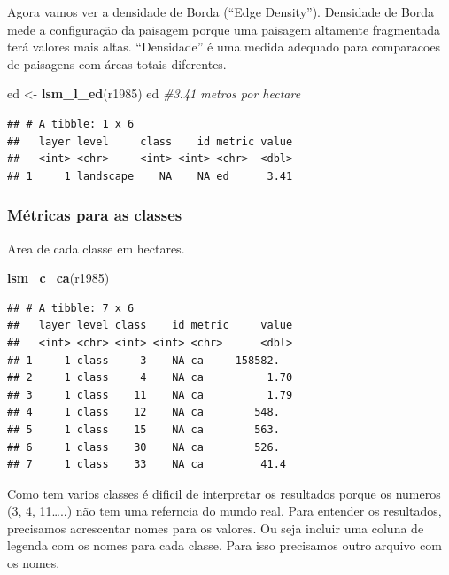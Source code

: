 \documentclass[
]{article}
\newenvironment{Shaded}{\begin{snugshade}}{\end{snugshade}}
\newcommand{\CommentTok}[1]{\textcolor[rgb]{0.56,0.35,0.01}{\textit{#1}}}
\newcommand{\FunctionTok}[1]{\textcolor[rgb]{0.13,0.29,0.53}{\textbf{#1}}}
\newcommand{\NormalTok}[1]{#1}
\newcommand{\OtherTok}[1]{\textcolor[rgb]{0.56,0.35,0.01}{#1}}
\begin{document}
Agora vamos ver a densidade de Borda (``Edge Density'').
Densidade de Borda mede a configuração da paisagem porque uma paisagem
altamente fragmentada terá valores mais altas. ``Densidade'' é uma medida
adequado para comparacoes de paisagens com áreas totais diferentes.

\begin{Shaded}
\begin{Highlighting}[]
\NormalTok{ed }\OtherTok{\textless{}{-}} \FunctionTok{lsm\_l\_ed}\NormalTok{(r1985) }
\NormalTok{ed }\CommentTok{\#3.41 metros por hectare}
\end{Highlighting}
\end{Shaded}

\begin{verbatim}
## # A tibble: 1 x 6
##   layer level     class    id metric value
##   <int> <chr>     <int> <int> <chr>  <dbl>
## 1     1 landscape    NA    NA ed      3.41
\end{verbatim}

\hypertarget{muxe9tricas-para-as-classes}{%
\subsubsection{Métricas para as classes}\label{muxe9tricas-para-as-classes}}

Area de cada classe em hectares.

\begin{Shaded}
\begin{Highlighting}[]
\FunctionTok{lsm\_c\_ca}\NormalTok{(r1985) }
\end{Highlighting}
\end{Shaded}

\begin{verbatim}
## # A tibble: 7 x 6
##   layer level class    id metric     value
##   <int> <chr> <int> <int> <chr>      <dbl>
## 1     1 class     3    NA ca     158582.  
## 2     1 class     4    NA ca          1.70
## 3     1 class    11    NA ca          1.79
## 4     1 class    12    NA ca        548.  
## 5     1 class    15    NA ca        563.  
## 6     1 class    30    NA ca        526.  
## 7     1 class    33    NA ca         41.4
\end{verbatim}

Como tem varios classes é dificil de interpretar os resultados porque
os numeros (3, 4, 11\ldots..) não tem uma referncia do mundo real.
Para entender os resultados, precisamos acrescentar nomes para os valores.
Ou seja incluir uma coluna de legenda com os nomes para cada classe. Para isso
precisamos outro arquivo com os nomes.
\end{document}
